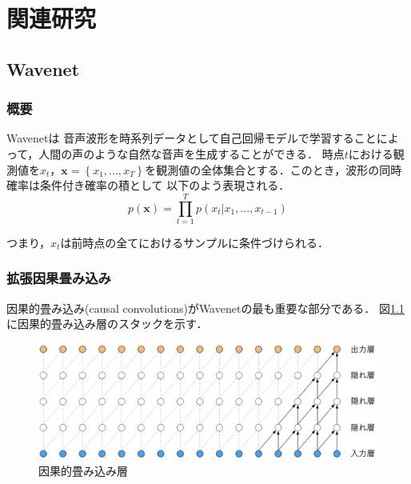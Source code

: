 \chapter{関連研究}

\section{Wavenet}

\subsection{概要}

Wavenet\cite{oord2016wavenet}は
音声波形を時系列データとして自己回帰モデルで学習することによって，人間の声のような自然な音声を生成することができる．
時点$t$における観測値を$x_t$，$\bm{x} = \left\{ x_1, ..., x_T \right\}$を観測値の全体集合とする．このとき，波形の同時確率は条件付き確率の積として
以下のよう表現される．
\begin{equation}
	p(\bm{x}) = \prod_{t=1}^T p(x_t | x_1, ..., x_{t-1})
\end{equation}

つまり，$x_t$は前時点の全てにおけるサンプルに条件づけられる．

\subsection{拡張因果畳み込み}

因果的畳み込み(causal convolutions)がWavenetの最も重要な部分である．
図\ref{fig:ccl}に因果的畳み込み層のスタックを示す．

\begin{figure}[t]
	\centering
	\includegraphics[width=\linewidth]{./figure/ccl.png}
	\caption{因果的畳み込み層}
	\label{fig:ccl}
\end{figure}
